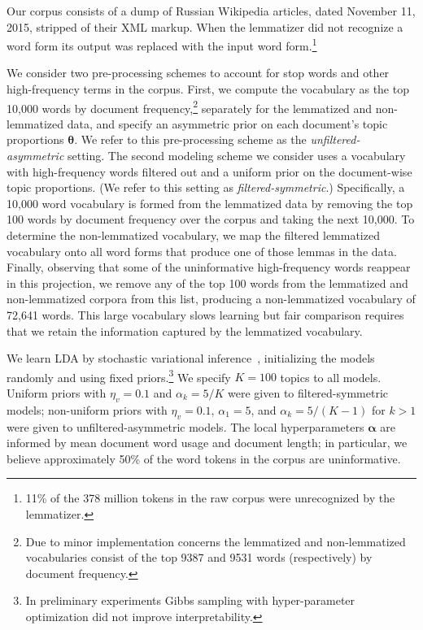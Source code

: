 \documentclass[11pt,letterpaper]{article}
\renewcommand{\vec}{\boldsymbol}   %
\newcommand{\valpha}{{\vec{\alpha}}}
\newcommand{\vtheta}{{\vec{\theta}}}
\begin{document}
{Our corpus consists of a dump of Russian Wikipedia articles, dated
November 11, 2015, stripped of their XML markup.
When the lemmatizer did not recognize a word form
its output was replaced with the input word form.\footnote{
    11\% of the 378 million tokens in the raw corpus were
    unrecognized by the lemmatizer.
}

We consider two pre-processing schemes to account for stop words and
other high-frequency terms in the corpus.  First, we compute the
vocabulary as the top 10,000 words by document frequency,\footnote{
    Due to minor implementation concerns the lemmatized and
    non-lemmatized vocabularies consist of the top 9387 and 9531 words
    (respectively) by document frequency.
}
separately for the lemmatized and non-lemmatized data, and
specify an asymmetric prior on each document's topic proportions
$\vtheta$.
We refer to this pre-processing scheme
as the \emph{unfiltered-asymmetric} setting.  The second modeling scheme we
consider uses a vocabulary with high-frequency words filtered out and a
uniform prior on the document-wise topic proportions.
(We refer to this setting as \emph{filtered-symmetric}.)
Specifically, a 10,000 word vocabulary is formed from the
lemmatized data by removing the top 100 words by document frequency
over the corpus and taking the next 10,000.  To determine the
non-lemmatized vocabulary, we map the filtered lemmatized
vocabulary onto all word forms that produce one of those lemmas in
the data.  Finally, observing that some of the uninformative
high-frequency words reappear in this projection, we remove any
of the top 100 words from the lemmatized and non-lemmatized corpora
from this list, producing a non-lemmatized vocabulary of 72,641 words.
This large vocabulary slows learning but fair comparison
requires that we retain the information captured by the lemmatized
vocabulary.

We learn LDA by stochastic variational
inference~\cite{hoffman2013}, initializing the models randomly and
using fixed priors.\footnote{
    In preliminary experiments Gibbs
    sampling with hyper-parameter optimization did not improve
    interpretability.
}
We specify $K = 100$ topics to all models.
Uniform priors with $\eta_v = 0.1$ and
$\alpha_k = 5 / K$ were given to
filtered-symmetric models; non-uniform priors with
$\eta_v = 0.1$, $\alpha_1 = 5$, and $\alpha_k = 5 / (K-1)$
for $k > 1$
were given to unfiltered-asymmetric models.
The local hyperparameters $\valpha$ are informed by mean
document word usage and document length; in particular, we
believe approximately 50\% of the word tokens in the corpus are
uninformative.

}
\end{document}
